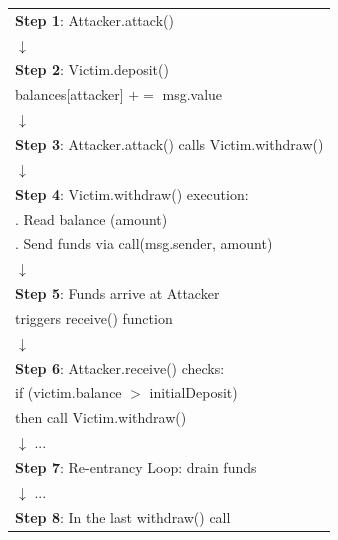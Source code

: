 \documentclass[12pt]{article}
\begin{document}
\begin{figure}[H]
    \centering
    \begin{minipage}{0.45\textwidth}
        \centering
        {\footnotesize
            \begin{tabular}{l}
                \textbf{Step 1}: Attacker.attack()                         \\
                $\downarrow$                                               \\
                \textbf{Step 2}: Victim.deposit()                          \\
                \quad balances[attacker] $\mathrel{+}= $ msg.value         \\
                $\downarrow$                                               \\
                \textbf{Step 3}: Attacker.attack() calls Victim.withdraw() \\
                $\downarrow$                                               \\
                \textbf{Step 4}: Victim.withdraw() execution:              \\
                \quad 1. Read balance (amount)                             \\
                \quad 2. Send funds via call(msg.sender, amount)           \\
                $\downarrow$                                               \\
                \textbf{Step 5}: Funds arrive at Attacker                  \\
                \quad triggers receive() function                          \\
                $\downarrow$                                               \\
                \textbf{Step 6}: Attacker.receive() checks:                \\
                \quad if (victim.balance $>$ initialDeposit)
                \\ then call Victim.withdraw() \\
                $\downarrow$ ...                                           \\
                \textbf{Step 7}: Re-entrancy Loop: drain funds             \\
                $\downarrow$ ...                                           \\
                \textbf{Step 8}: In the last withdraw() call               \\

\end{tabular}}
\end{minipage}
\end{figure}
\end{document}
